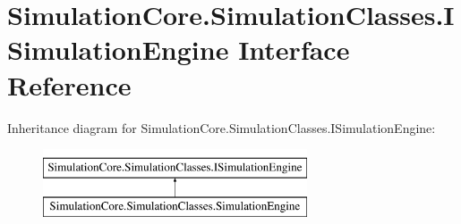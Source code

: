 \hypertarget{interface_simulation_core_1_1_simulation_classes_1_1_i_simulation_engine}{}\section{Simulation\+Core.\+Simulation\+Classes.\+I\+Simulation\+Engine Interface Reference}
\label{interface_simulation_core_1_1_simulation_classes_1_1_i_simulation_engine}
Inheritance diagram for Simulation\+Core.\+Simulation\+Classes.\+I\+Simulation\+Engine\+:\begin{figure}[H]
\begin{center}
\leavevmode
\includegraphics[height=2.000000cm]{interface_simulation_core_1_1_simulation_classes_1_1_i_simulation_engine}
\end{center}
\end{figure}
